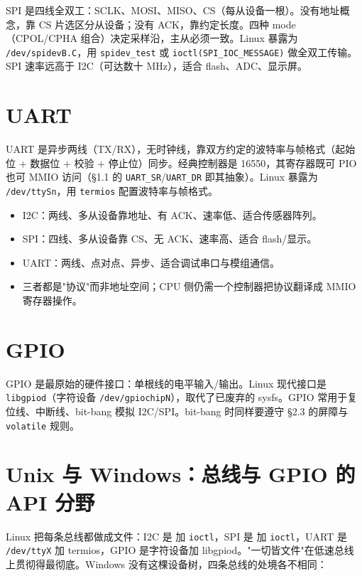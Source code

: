 \documentclass[12pt,a4paper,fontset=fandol]{ctexbook}
\newcommand{\kw}[1]{\texttt{#1}}
\begin{document}
SPI 是四线全双工：SCLK、MOSI、MISO、CS（每从设备一根）。没有地址概念，靠 CS 片选区分从设备；没有 ACK，靠约定长度。四种 mode（CPOL/CPHA 组合）决定采样沿，主从必须一致。Linux 暴露为 \texttt{/dev/spidevB.C}，用 \texttt{spidev\_test} 或 \texttt{ioctl(SPI\_IOC\_MESSAGE)} 做全双工传输。SPI 速率远高于 I2C（可达数十 MHz），适合 flash、ADC、显示屏。

\section{UART}\label{sec:uart}

UART 是异步两线（TX/RX），无时钟线，靠双方约定的波特率与帧格式（起始位 + 数据位 + 校验 + 停止位）同步。经典控制器是 16550，其寄存器既可 PIO 也可 MMIO 访问（§1.1 的 \texttt{UART\_SR}/\allowbreak{}\texttt{UART\_DR} 即其抽象）。Linux 暴露为 \texttt{/dev/ttySn}，用 \texttt{termios} 配置波特率与帧格式。

\begin{tcolorbox}[compare={I2C vs SPI vs UART}]
\begin{itemize}[nosep]
  \item I2C：两线、多从设备靠地址、有 ACK、速率低、适合传感器阵列。
  \item SPI：四线、多从设备靠 CS、无 ACK、速率高、适合 flash/显示。
  \item UART：两线、点对点、异步、适合调试串口与模组通信。
  \item 三者都是"协议"而非地址空间；CPU 侧仍需一个控制器把协议翻译成 MMIO 寄存器操作。
\end{itemize}
\end{tcolorbox}

\section{GPIO}\label{sec:gpio}

GPIO 是最原始的硬件接口：单根线的电平输入/输出。Linux 现代接口是 \texttt{libgpiod}（字符设备 \texttt{/dev/gpiochipN}），取代了已废弃的 sysfs。GPIO 常用于复位线、中断线、bit-bang 模拟 I2C/SPI。bit-bang 时同样要遵守 §2.3 的屏障与 \kw{volatile} 规则。

\section{Unix 与 Windows：总线与 GPIO 的 API 分野}\label{sec:bus-os}

Linux 把每条总线都做成文件：I2C 是  加 \texttt{ioctl}，SPI 是  加 \texttt{ioctl}，UART 是 \texttt{/dev/ttyX} 加 termios，GPIO 是字符设备加 libgpiod。"一切皆文件"在低速总线上贯彻得最彻底。Windows 没有这棵设备树，四条总线的处境各不相同：
\end{document}
